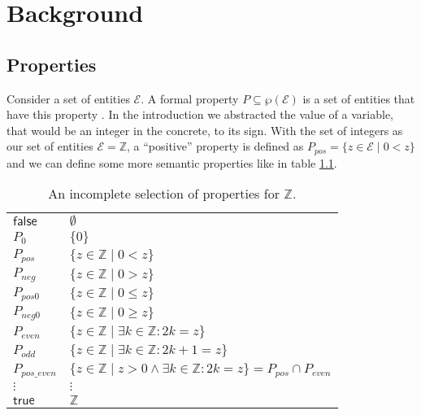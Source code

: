 \chapter{Background} \label{chap:background}





\section{Properties}

Consider a set of entities $\mathcal{E}$. A formal property $P\subseteq \wp(\mathcal{E}) $ is a set of entities that have this property \cite[chapter 8]{cousot2021}. In the introduction we abstracted the value of a variable, that would be an integer in the concrete, to its sign. With the set of integers as our set of entities $\mathcal{E}=\mathbb{Z}$, a ``positive'' property is defined as $P_{pos}=\{z\in \mathcal{E} \;|\; 0<z\}$ and we can define some more semantic properties like in table \ref{table:properties}.
\begin{table}[hbt]
\begin{center}
  \begin{tabular}{l|l}
  $\mathsf{false}$ & $\emptyset$\\
   $P_{0}$ & $\{0\}$\\
   $P_{pos}$ & $\{z\in \mathbb{Z} \;|\; 0<z\}$\\
   $P_{neg}$ & $\{z\in \mathbb{Z} \;|\; 0>z\}$\\
   $P_{pos0}$ & $\{z\in \mathbb{Z} \;|\; 0\leq z\}$\\
   $P_{neg0}$ & $\{z\in \mathbb{Z} \;|\; 0\geq z\}$\\
   $P_{even}$ & $\{z\in \mathbb{Z} \;|\; \exists k\in\mathbb{Z}:2k=z \}$ \\
   $P_{odd}$ & $\{z\in \mathbb{Z} \;|\; \exists k\in\mathbb{Z}:2k+1=z \}$ \\
   $P_{pos\_even}$ & $\{z\in \mathbb{Z} \;|\; z>0 \wedge \exists k\in\mathbb{Z}:2k=z \} = P_{pos} \cap P_{even}$ \\
   $\vdots$ &$\vdots$\\
   $\mathsf{true}$ & $\mathbb{Z}$\\
  \end{tabular}
  \caption{An incomplete selection of properties for $\mathbb{Z}$.}\label{table:properties}
  \end{center}
\end{table}

